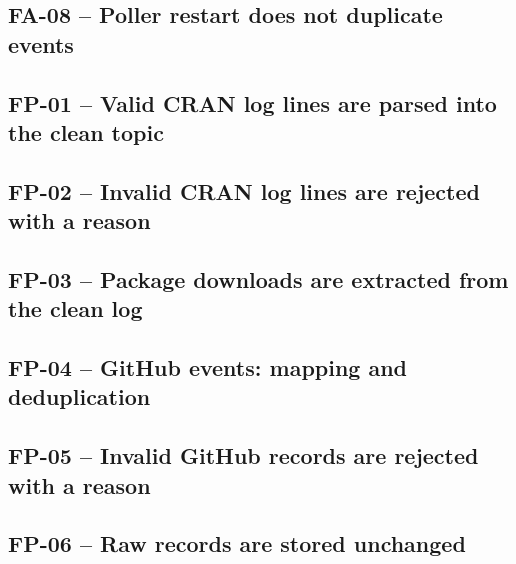 \subsection*{FA-08 -- Poller restart does not duplicate events}


\subsection*{FP-01 -- Valid CRAN log lines are parsed into the clean topic}


\subsection*{FP-02 -- Invalid CRAN log lines are rejected with a reason}


\subsection*{FP-03 -- Package downloads are extracted from the clean log}


\subsection*{FP-04 -- GitHub events: mapping and deduplication}


\subsection*{FP-05 -- Invalid GitHub records are rejected with a reason}


\subsection*{FP-06 -- Raw records are stored unchanged}



